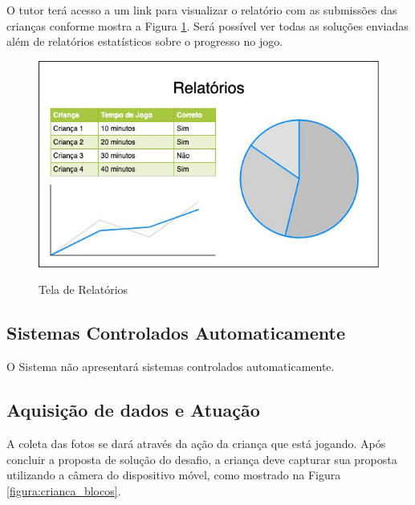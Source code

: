    O tutor terá acesso a um link para visualizar o relatório com as submissões das crianças conforme mostra a Figura \ref{figura:tela_relatorios}. Será possível ver todas as soluções enviadas além de relatórios estatísticos sobre o progresso no jogo.
    
    \begin{figure}[H]
        \caption{Tela de Relatórios}
        \centering
        \includegraphics[width=\linewidth]{Imagens/Cap3/Tela Relatorios.jpg}
        \label{figura:tela_relatorios}
    \end{figure}
    
    \subsection{Sistemas Controlados Automaticamente}
    O Sistema não apresentará sistemas controlados automaticamente.
    
    \subsection{Aquisição de dados e Atuação}
    A coleta das fotos se dará através da ação da criança que está jogando. Após concluir a proposta de solução do desafio, a criança deve capturar sua proposta utilizando a câmera do dispositivo móvel, como mostrado na Figura \ref{figura:crianca_blocos}.
    

